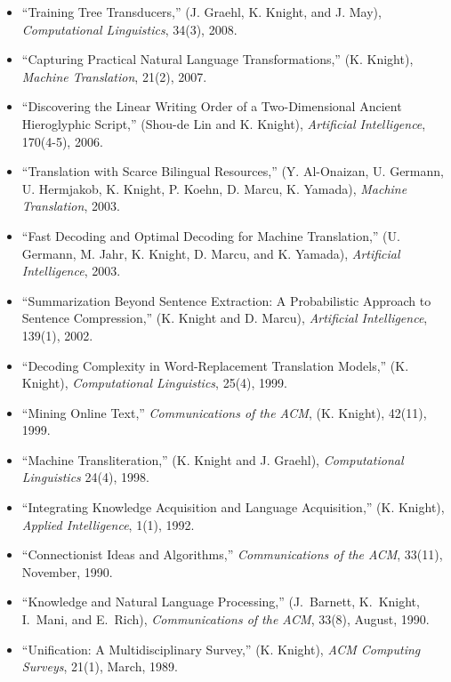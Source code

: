 \begin{itemize}
\item ``Training Tree Transducers,'' (J. Graehl, K. Knight, and J. May), 
{\em Computational Linguistics}, 34(3), 2008. 

\item ``Capturing Practical Natural Language Transformations,''  (K. Knight),
{\em Machine Translation}, 21(2), 2007. 

\item ``Discovering the Linear Writing Order of a Two-Dimensional
Ancient Hieroglyphic Script,'' (Shou-de Lin and K. Knight),
{\em Artificial Intelligence}, 170(4-5), 2006.

\item ``Translation with Scarce Bilingual Resources,'' (Y. Al-Onaizan, U. 
Germann, U. Hermjakob, K. Knight, P. Koehn, D. Marcu, K. Yamada), 
{\em Machine Translation}, 2003.

\item ``Fast Decoding and Optimal Decoding for Machine Translation,'' (U. 
Germann, M. Jahr, K. Knight, D. Marcu, and K. Yamada), {\em Artificial 
Intelligence}, 2003.

\item ``Summarization Beyond Sentence Extraction: A Probabilistic Approach 
to Sentence Compression,'' (K. Knight and D. Marcu), {\em Artificial 
Intelligence}, 139(1), 2002.

\item ``Decoding Complexity in Word-Replacement Translation Models,'' 
(K. Knight),
{\em Computational Linguistics}, 25(4), 1999. 

\item ``Mining Online Text,'' {\em Communications of the ACM}, 
(K. Knight), 42(11), 1999.

\item ``Machine Transliteration,'' 
(K. Knight and J. Graehl), {\em Computational Linguistics} 24(4), 1998.

\item ``Integrating Knowledge Acquisition and Language Acquisition,''
(K. Knight),
{\em Applied Intelligence}, 1(1), 1992.

\item ``Connectionist Ideas and Algorithms,'' {\em Communications of the ACM}, 
33(11), November, 1990.

\item ``Knowledge and Natural Language Processing,'' (J.~Barnett, K.~Knight,
I.~Mani, and E.~Rich), {\em Communications of the ACM}, 33(8), August, 1990.

\item ``Unification: A Multidisciplinary Survey,'' 
(K. Knight),
{\em ACM Computing
Surveys}, 21(1), March, 1989.
\end{itemize}


